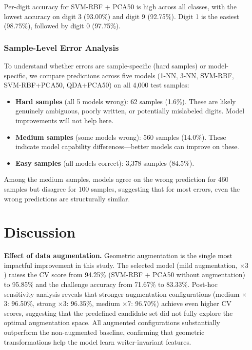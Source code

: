 \documentclass[11pt,a4paper,twocolumn]{article}
\begin{document}
Per-digit accuracy for SVM-RBF + PCA50 is high across all classes, with the lowest accuracy on digit 3 (93.00\%) and digit 9 (92.75\%). Digit 1 is the easiest (98.75\%), followed by digit 0 (97.75\%).

\subsubsection{Sample-Level Error Analysis}

To understand whether errors are sample-specific (hard samples) or model-specific, we compare predictions across five models (1-NN, 3-NN, SVM-RBF, SVM-RBF+PCA50, QDA+PCA50) on all 4,000 test samples:

\begin{itemize}[noitemsep]
    \item \textbf{Hard samples} (all 5 models wrong): 62 samples (1.6\%). These are likely genuinely ambiguous, poorly written, or potentially mislabeled digits. Model improvements will not help here.
    \item \textbf{Medium samples} (some models wrong): 560 samples (14.0\%). These indicate model capability differences---better models can improve on these.
    \item \textbf{Easy samples} (all models correct): 3,378 samples (84.5\%).
\end{itemize}

Among the medium samples, models agree on the wrong prediction for 460 samples but disagree for 100 samples, suggesting that for most errors, even the wrong predictions are structurally similar.

\section{Discussion}

\textbf{Effect of data augmentation.} Geometric augmentation is the single most impactful improvement in this study. The selected model (mild augmentation, $\times 3$) raises the CV score from 94.25\% (SVM-RBF + PCA50 without augmentation) to 95.85\% and the challenge accuracy from 71.67\% to 83.33\%. Post-hoc sensitivity analysis reveals that stronger augmentation configurations (medium $\times$3: 96.50\%, strong $\times$3: 96.35\%, medium $\times$7: 96.70\%) achieve even higher CV scores, suggesting that the predefined candidate set did not fully explore the optimal augmentation space. All augmented configurations substantially outperform the non-augmented baseline, confirming that geometric transformations help the model learn writer-invariant features.
\end{document}
